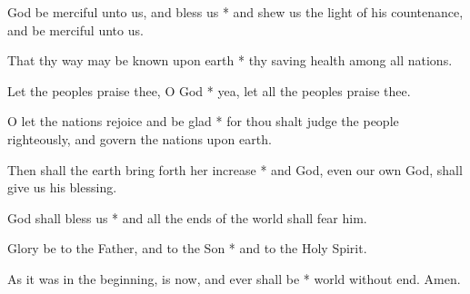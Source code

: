 God be merciful unto us, and bless us * and shew us the light of his countenance, and be merciful unto us.

That thy way may be known upon earth * thy saving health among all nations.

Let the peoples praise thee, O God * yea, let all the peoples praise thee.

O let the nations rejoice and be glad * for thou shalt judge the people righteously, and govern the nations upon earth.

Then shall the earth bring forth her increase * and God, even our own God, shall give us his blessing.

God shall bless us * and all the ends of the world shall fear him.

Glory be to the Father, and to the Son * and to the Holy Spirit.

As it was in the beginning, is now, and ever shall be * world without end. Amen.